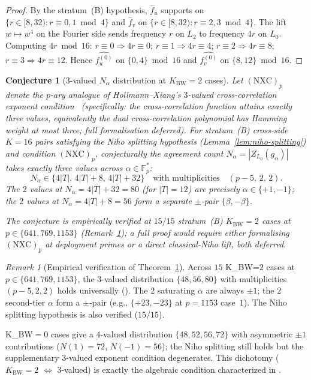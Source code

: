 \documentclass[11pt]{article}
\newtheorem{conjecture}[theorem]{Conjecture}
\theoremstyle{definition}
\theoremstyle{remark}
\newtheorem{remark}[theorem]{Remark}
\begin{document}
\begin{proof}
By the stratum~(B) hypothesis, $\hat f_u$ supports on $\{r \in [8, 32) :
r \equiv 0, 1 \bmod 4\}$ and $\hat f_v$ on $\{r \in [8, 32) :
r \equiv 2, 3 \bmod 4\}$. The lift $w \mapsto w^4$ on the Fourier side
sends frequency $r$ on $L_2$ to frequency $4r$ on $L_0$. Computing
$4r \bmod 16$: $r \equiv 0 \Rightarrow 4r \equiv 0$; $r \equiv 1 \Rightarrow
4r \equiv 4$; $r \equiv 2 \Rightarrow 4r \equiv 8$; $r \equiv 3 \Rightarrow
4r \equiv 12$. Hence $\hat{f_u^{(0)}}$ on $\{0, 4\} \bmod 16$ and
$\hat{f_v^{(0)}}$ on $\{8, 12\} \bmod 16$.
\end{proof}

\begin{conjecture}[3-valued $N_\alpha$ distribution at $K_{\mathrm{BW}} = 2$ cases]
\label{thm:niho-3-valued}
Let $(\mathrm{NXC})_p$ denote the $p$-ary analogue of Hollmann--Xiang's
$3$-valued cross-correlation exponent condition~\cite{HollmannXiang2001}
(specifically: the cross-correlation function attains exactly three
values, equivalently the dual cross-correlation polynomial has Hamming
weight at most three; full formalisation deferred). For stratum~(B)
cross-side $K = 16$ pairs satisfying the Niho splitting hypothesis
(Lemma~\ref{lem:niho-splitting}) and condition $(\mathrm{NXC})_p$,
\emph{conjecturally} the agreement count
$N_\alpha = |Z_{L_0}(g_\alpha)|$ takes exactly three values across
$\alpha \in \mathbb{F}_p^*$:
\[
N_\alpha \in \{4|T|, \, 4|T| + 8, \, 4|T| + 32\}
\quad \text{with multiplicities} \quad (p - 5, \, 2, \, 2).
\]
The $2$ values at $N_\alpha = 4|T| + 32 = 80$ (for $|T| = 12$) are
precisely $\alpha \in \{+1, -1\}$; the $2$ values at
$N_\alpha = 4|T| + 8 = 56$ form a separate $\pm$-pair
$\{\beta, -\beta\}$.

The conjecture is empirically verified at $15/15$ stratum~(B)
$K_{\mathrm{BW}}=2$ cases at $p \in \{641, 769, 1153\}$
(Remark~\ref{rem:niho-empirical}); a full proof would require either
formalising $(\mathrm{NXC})_p$ at deployment primes or a direct
classical-Niho lift, both deferred.
\end{conjecture}

\begin{remark}[Empirical verification of Theorem~\ref{thm:niho-3-valued}]
\label{rem:niho-empirical}
Across $15$ K\_BW=$2$ cases at $p \in \{641, 769, 1153\}$, the $3$-valued
distribution $\{48, 56, 80\}$ with multiplicities $(p-5, 2, 2)$ holds
universally (\cite{CompanionRepo}). The $2$ saturating
$\alpha$ are always $\pm 1$; the $2$ second-tier $\alpha$ form a
$\pm$-pair (e.g., $\{+23, -23\}$ at $p = 1153$ case~$1$). The Niho
splitting hypothesis is also verified ($15/15$).

K\_BW$= 0$ cases give a $4$-valued distribution $\{48, 52, 56, 72\}$
with asymmetric $\pm 1$ contributions ($N(1) = 72$, $N(-1) = 56$);
the Niho splitting still holds but the supplementary 3-valued exponent
condition degenerates. This dichotomy ($K_{\mathrm{BW}}=2$ $\iff$ $3$-valued) is
exactly the algebraic condition characterized in
\cite{CompanionRepo}.
\end{remark}
\end{document}
